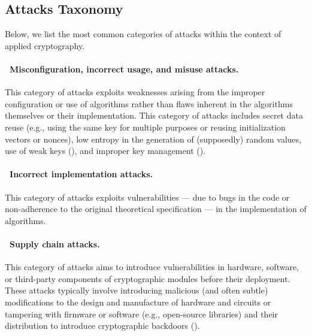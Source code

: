 \subsection{Attacks Taxonomy}\label{sec:cryptographic_security_overview:attacks}

Below, we list the most common categories of attacks within the context of applied cryptography.

\paragraph*{\faCog~Misconfiguration, incorrect usage, and misuse attacks.} This category of attacks exploits weaknesses arising from the improper configuration or use of algorithms rather than flaws inherent in the algorithms themselves or their implementation. This category of attacks includes secret data reuse (e.g., using the same key for multiple purposes or reusing initialization vectors or nonces), low entropy in the generation of (supposedly) random values,
use of weak keys (), and improper key management ().

\paragraph*{\faBug~Incorrect implementation attacks.} This category of attacks exploits vulnerabilities --- due to bugs in the code or non-adherence to the original theoretical specification --- in the implementation of algorithms.


\paragraph*{\faShippingFast~Supply chain attacks.} This category of attacks aims to introduce vulnerabilities in hardware, software, or third-party components of cryptographic modules before their deployment. These attacks typically involve introducing malicious (and often subtle) modifications to the design and manufacture of hardware and circuits or tampering with firmware or software (e.g., open-source libraries) and their distribution to introduce cryptographic backdoors ().

